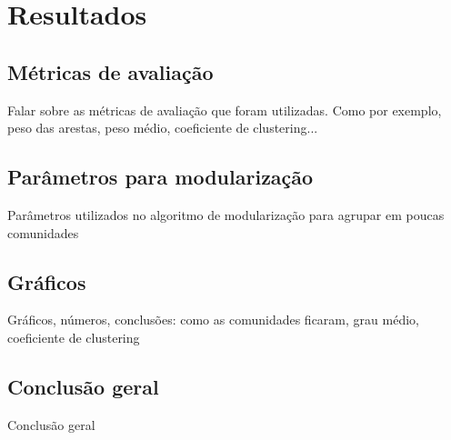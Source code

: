 \chapter{Resultados}
\label{cap4_resultados}

\section{Métricas de avaliação}
\label{secao_metricas_avaliacao}

Falar sobre as métricas de avaliação que foram utilizadas. Como por exemplo, peso das arestas, peso médio, coeficiente de clustering...

\section{Parâmetros para modularização}
\label{secao_parametros_modularizacao}
Parâmetros utilizados no algoritmo de modularização para agrupar em poucas comunidades 

\section{Gráficos}
\label{secao_graficos}

Gráficos, números, conclusões: como as comunidades ficaram, grau médio, coeficiente de clustering

\section{Conclusão geral}
\label{secao_conclusao_geral}

Conclusão geral
